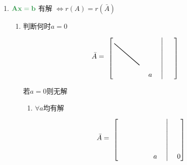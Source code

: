 \documentclass[a4paper,12pt]{article}
\begin{document}
    \begin{enumerate}
        \item $\mathbf{\color[rgb]{0.2, 0.6, 0.3}{Ax = b}}$ 有解 $\Leftrightarrow r(A) = r(\bar{A})$
        \begin{enumerate}
            \item 判断何时$a = 0$
            \[
                \bar{A} =
                \begin{tikzpicture}[baseline=(current bounding box.center)]
                    \node (mat) {
                        $\begin{bmatrix}
                             \; & \; & \; & \; & \; & \;\big|\; & \; \\
                             \; & \; & \; & \; & \; & \;\big|\; & \; \\
                             \; & \; & \; & \; & \; & \;\big|\; & \; \\
                             \; & \; & \; & \; & \; & \;\big|\; & \; \\
                             \; & \; & \; & \; & a  & \;\big|\; &
                        \end{bmatrix}$
                    };

                    \draw[thick,black]
                    ([xshift=12pt,yshift=-12pt]mat.north west) --
                    ([xshift=-60pt,yshift=24pt]mat.south east);
                \end{tikzpicture}
            \]
            若$a = 0$则{\color{red}{有可能}}无解
            \begin{enumerate}
                \item $\forall a$均有解
                \[
                    \bar{A} =
                    \begin{tikzpicture}[baseline=(current bounding box.center)]
                        \node (mat) {
                            $\begin{bmatrix}
                                 \; & \; & \; & \; & \; & \;\big|\; & \; \\
                                 \; & \; & \; & \; & \; & \;\big|\; & \; \\
                                 \; & \; & \; & \; & \; & \;\big|\; & \; \\
                                 \; & \; & \; & \; & \; & \;\big|\; & \; \\
                                 \; & \; & \; & \; & a  & \;\big|\; & 0
                            \end{bmatrix}$
                        };


\end{tikzpicture}\]
\end{enumerate}
\end{enumerate}
\end{enumerate}
\end{document}
